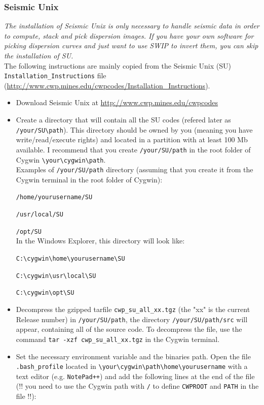 \documentclass[twoside,a4paper]{article}
\begin{document}
\subsubsection{Seismic Unix}
\label{subsec:WinSU}
\textit{The installation of Seismic Unix is only necessary to handle seismic data in order to compute, stack and pick dispersion images. If you have your own software for picking dispersion curves and just want to use SWIP to invert them, you can skip the installation of SU.}\\[2ex]
The following instructions are mainly copied from the Seismic Unix (SU) \verb|Installation_Instructions| file (\url{http://www.cwp.mines.edu/cwpcodes/Installation_Instructions}).
\begin{itemize}
\setlength\itemsep{2ex}
\setlength{\parindent}{5ex}
\item Download Seismic Unix at \url{http://www.cwp.mines.edu/cwpcodes}

\item Create a directory that will contain all the SU codes (refered later as \verb|/your/SU\path|). This directory should be owned by you (meaning you have write/read/execute rights) and located in a partition with at least 100 Mb available. I recommend that you create \verb|/your/SU/path| in the root folder of Cygwin \verb|\your\cygwin\path|.\\[1ex]
Examples of \verb|/your/SU/path| directory (assuming that you create it from the Cygwin terminal in the root folder of Cygwin):

\verb|/home/yourusername/SU|

\verb|/usr/local/SU|

\verb|/opt/SU|\\[1ex]
In the Windows Explorer, this directory will look like:

\verb|C:\cygwin\home\yourusername\SU|

\verb|C:\cygwin\usr\local\SU|

\verb|C:\cygwin\opt\SU|

\item Decompress the gzipped tarfile \verb|cwp_su_all_xx.tgz| (the "xx" is the current Release number) in \verb|/your/SU/path|, the directory \verb|/your/SU/path/src| will appear, containing all of the source code. To decompress the file, use the command \verb|tar -xzf cwp_su_all_xx.tgz| in the Cygwin terminal.

\item Set the necessary environment variable and the binaries path. Open the file \verb|.bash_profile| located in \verb|\your\cygwin\path\home\yourusername| with a text editor (e.g. \verb|NotePad++|) and add the following lines at the end of the file (!! you need to use the Cygwin path with \verb|/| to define \verb|CWPROOT| and \verb|PATH| in the file !!):


\end{itemize}
\end{document}
